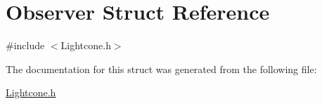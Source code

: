 \hypertarget{structObserver}{}\section{Observer Struct Reference}
\label{structObserver}


{\ttfamily \#include $<$Lightcone.\+h$>$}



The documentation for this struct was generated from the following file\+:\begin{DoxyCompactItemize}
\item 
\hyperlink{Lightcone_8h}{Lightcone.\+h}\end{DoxyCompactItemize}
